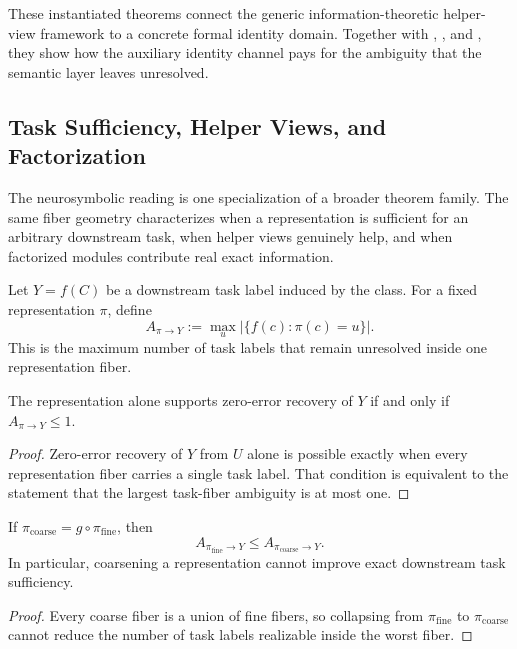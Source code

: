These instantiated theorems connect the generic information-theoretic helper-view framework to a concrete formal identity domain. Together with , , and , they show how the auxiliary identity channel pays for the ambiguity that the semantic layer leaves unresolved.

\subsection{Task Sufficiency, Helper Views, and Factorization}

The neurosymbolic reading is one specialization of a broader theorem family. The same fiber geometry characterizes when a representation is sufficient for an arbitrary downstream task, when helper views genuinely help, and when factorized modules contribute real exact information.

\begin{definition}
Let $Y=f(C)$ be a downstream task label induced by the class. For a fixed representation $\pi$, define
\[
A_{\pi \to Y} := \max_u \left|\{f(c) : \pi(c)=u\}\right|.
\]
This is the maximum number of task labels that remain unresolved inside one representation fiber.
\end{definition}

\begin{theorem}\label{thm:task-sufficiency}
The representation alone supports zero-error recovery of $Y$ if and only if $A_{\pi \to Y} \le 1$.
\end{theorem}

\begin{proof}
Zero-error recovery of $Y$ from $U$ alone is possible exactly when every representation fiber carries a single task label. That condition is equivalent to the statement that the largest task-fiber ambiguity is at most one.
\end{proof}

\begin{corollary}\label{cor:task-coarsening-mono}
If $\pi_{\mathrm{coarse}} = g \circ \pi_{\mathrm{fine}}$, then
\[
A_{\pi_{\mathrm{fine}} \to Y} \le A_{\pi_{\mathrm{coarse}} \to Y}.
\]
In particular, coarsening a representation cannot improve exact downstream task sufficiency.
\end{corollary}

\begin{proof}
Every coarse fiber is a union of fine fibers, so collapsing from $\pi_{\mathrm{fine}}$ to $\pi_{\mathrm{coarse}}$ cannot reduce the number of task labels realizable inside the worst fiber.
\end{proof}

